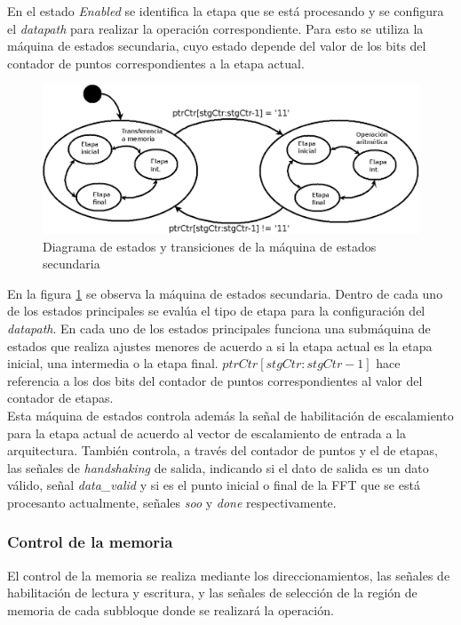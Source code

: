 En el estado \textit{Enabled} se identifica la etapa que se está procesando y se configura el
\textit{datapath} para realizar la operación correspondiente. Para esto se utiliza la máquina de
estados secundaria, cuyo estado depende del valor de los bits del contador de puntos
correspondientes a la etapa actual.

\begin{figure}[htb!]
        \centering
        \includegraphics[width=13cm]{./figures/SMr4op.png}
        \caption{Diagrama de estados y transiciones de la máquina de estados secundaria}
        \label{fig:r4stateop}
\end{figure}

En la figura \ref{fig:r4stateop} se observa la máquina de estados secundaria. Dentro de cada uno de
los estados principales se evalúa el tipo de etapa para la configuración del \textit{datapath}.
En cada uno de los estados principales funciona una submáquina de estados que realiza ajustes
menores de acuerdo a si la etapa actual es la etapa inicial, una intermedia o la etapa final. $ptrCtr[stgCtr:stgCtr-1]$ hace
referencia a los dos bits del contador de puntos correspondientes al valor del contador de etapas.\\
Esta máquina de estados controla además la señal de habilitación de escalamiento para la etapa
actual de acuerdo al vector de escalamiento de entrada a la arquitectura. También controla, a través
del contador de puntos y el de etapas, las señales de \textit{handshaking} de salida, indicando si
el dato de salida es un dato válido, señal \textit{data\_valid} y si es el punto inicial o final de
la FFT que se está procesanto actualmente, señales \textit{soo} y \textit{done} respectivamente.

\subsubsection{Control de la memoria}

El control de la memoria se realiza mediante los direccionamientos, las señales de habilitación de
lectura y escritura, y las señales de selección de la región de memoria de cada subbloque donde se
realizará la operación.

